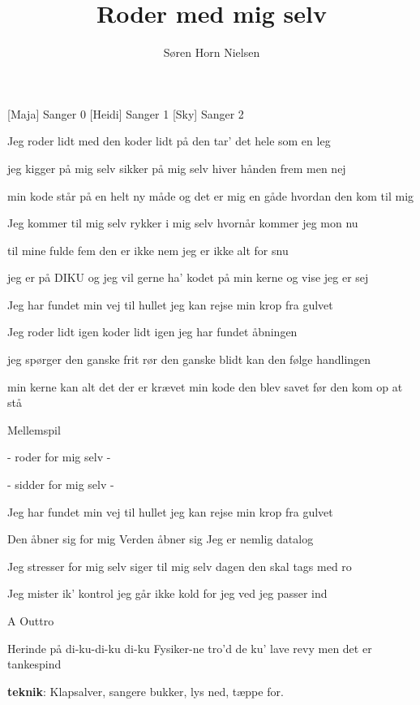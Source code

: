 \documentclass[a4paper,11pt]{article}
\title{Roder med mig selv}
\author{Søren Horn Nielsen}
\begin{document}
\maketitle

\begin{roles}
[Maja] Sanger 0
[Heidi] Sanger 1
[Sky] Sanger 2
\end{roles}

\begin{props}
\end{props}


\begin{song}

  Jeg roder lidt med den
  koder lidt på den
  tar' det hele som en leg
  
  jeg kigger på mig selv
  sikker på mig selv
  hiver hånden frem men nej
  
  min kode står på en helt ny måde
  og det er mig en gåde
  hvordan den kom til mig

  Jeg kommer til mig selv
  rykker i mig selv
  hvornår kommer jeg mon nu
  
  til mine fulde fem
  den er ikke nem
  jeg er ikke alt for snu
  
  jeg er på DIKU og jeg vil gerne
  ha' kodet på min kerne
  og vise jeg er sej
  
  Jeg har fundet min vej til hullet
  jeg kan rejse min krop fra gulvet
  
  Jeg roder lidt igen
  koder lidt igen
  jeg har fundet åbningen
  
  jeg spørger den ganske frit
  rør den ganske blidt
  kan den følge handlingen
  
  min kerne kan alt det der er krævet
  min kode den blev savet
  før den kom op at stå
  
  \scene Mellemspil
  
  - roder for mig selv -
  
  - sidder for mig selv -
  
  Jeg har fundet min vej til hullet
  jeg kan rejse min krop fra gulvet
  
  Den åbner sig for mig
  Verden åbner sig
  Jeg er nemlig datalog
  
  Jeg stresser for mig selv
  siger til mig selv
  dagen den skal tags med ro
  
  Jeg mister ik' kontrol
  jeg går ikke kold
  for jeg ved jeg passer ind
  
  \scene A Outtro

  Herinde på di-ku-di-ku di-ku
  Fysiker-ne tro'd de ku'
  lave revy men det er tankespind

\end{song}
\scene \textbf{teknik}: Klapsalver, sangere bukker, lys ned, tæppe
for.
\end{document}
